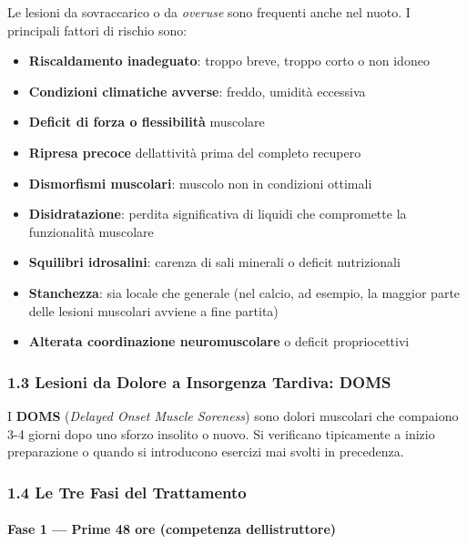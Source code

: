 \documentclass[a4paper,11pt]{article}
\providecommand{\tightlist}{%
  \setlength{\itemsep}{0pt}\setlength{\parskip}{0pt}}
\begin{document}
Le lesioni da sovraccarico o da \emph{overuse} sono frequenti anche nel
nuoto. I principali fattori di rischio sono:

\begin{itemize}
      \tightlist
      \item
            \textbf{Riscaldamento inadeguato}: troppo breve, troppo corto o non
            idoneo
      \item
            \textbf{Condizioni climatiche avverse}: freddo, umidità eccessiva
      \item
            \textbf{Deficit di forza o flessibilità} muscolare
      \item
            \textbf{Ripresa precoce} dell\textquotesingle attività prima del
            completo recupero
      \item
            \textbf{Dismorfismi muscolari}: muscolo non in condizioni ottimali
      \item
            \textbf{Disidratazione}: perdita significativa di liquidi che
            compromette la funzionalità muscolare
      \item
            \textbf{Squilibri idrosalini}: carenza di sali minerali o deficit
            nutrizionali
      \item
            \textbf{Stanchezza}: sia locale che generale (nel calcio, ad esempio,
            la maggior parte delle lesioni muscolari avviene a fine partita)
      \item
            \textbf{Alterata coordinazione neuromuscolare} o deficit
            propriocettivi
\end{itemize}

\subsubsection{1.3 Lesioni da Dolore a Insorgenza Tardiva:
      DOMS}\label{lesioni-da-dolore-a-insorgenza-tardiva-doms}

I \textbf{DOMS} (\emph{Delayed Onset Muscle Soreness}) sono dolori
muscolari che compaiono 3-4 giorni dopo uno sforzo insolito o nuovo. Si
verificano tipicamente a inizio preparazione o quando si introducono
esercizi mai svolti in precedenza.

\subsubsection{1.4 Le Tre Fasi del
      Trattamento}\label{le-tre-fasi-del-trattamento}

\paragraph{Fase 1 --- Prime 48 ore (competenza
      dell\textquotesingle istruttore)}\label{fase-1-prime-48-ore-competenza-dellistruttore}
\end{document}
